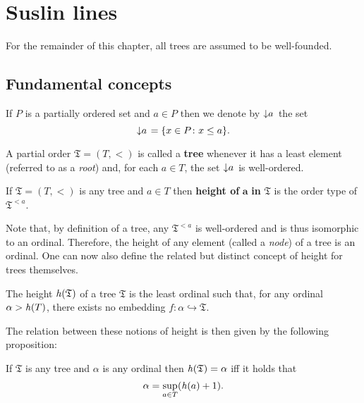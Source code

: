 \chapter{Suslin lines}

\begin{assn}
	For the remainder of this chapter, all trees are assumed to be well-founded.
\end{assn}


\section{Fundamental concepts}

\begin{dfn}
	If $P$ is a partially ordered set and $a\in P$ then we denote by $\left\downarrow a\right.$ the set
	\begin{equation}
		\left\downarrow a\right.=\lbrace x\in P\colon x\leq a \rbrace.
	\end{equation}
\end{dfn}

\begin{dfn}[Tree]
	A partial order $\mathfrak{T}=(T,<)$ is called a \textbf{tree} whenever it has a least element (referred to as a \textit{root}) and, for each $a\in T$, the set $\left\downarrow a\right.$ is well-ordered.
\end{dfn}

\begin{dfn}[Height]
	If $\mathfrak{T}=(T,<)$ is any tree and $a\in T$ then \textbf{height of }$\mathbf{a}$\textbf{ in }$\bm{\mathfrak{T}}$ is the order type of $\mathfrak{T}^{<a}$.
\end{dfn}

Note that, by definition of a tree, any $\mathfrak{T}^{<a}$ is well-ordered and is thus isomorphic to an ordinal.  Therefore, the height of any element (called a \textit{node}) of a tree is an ordinal.  One can now also define the related but distinct concept of height for trees themselves.

\begin{dfn}
	The height $\mathit{h}(\mathfrak{T})$ of a tree $\mathfrak{T}$ is the least ordinal such that, for any ordinal $\alpha>\mathit{h}(T)$, there exists no embedding $f\colon\alpha\hookrightarrow\mathfrak{T}$.
\end{dfn}

The relation between these notions of height is then given by the following proposition:

\begin{prp}
	If $\mathfrak{T}$ is any tree and $\alpha$ is any ordinal then $\mathit{h}(\mathfrak{T})=\alpha$ iff it holds that
	\begin{equation}
		\alpha=\sup_{a\in T}(\mathit{h}(a)+1).
	\end{equation}
\end{prp}

